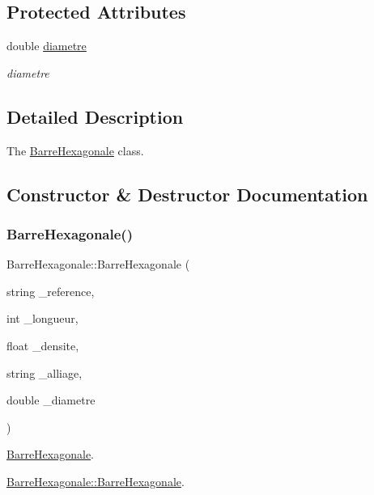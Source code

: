 \subsection*{Protected Attributes}
\begin{DoxyCompactItemize}
\item 
double \hyperlink{class_barre_hexagonale_acd0c0f0b698b467a732e44b28c5c17d1}{diametre}
\begin{DoxyCompactList}\small\item\em diametre \end{DoxyCompactList}\end{DoxyCompactItemize}


\subsection{Detailed Description}
The \hyperlink{class_barre_hexagonale}{Barre\+Hexagonale} class. 

\subsection{Constructor \& Destructor Documentation}
\mbox{\label{class_barre_hexagonale_a2d9337f0f27d17941747999db696f024}} 
\subsubsection{\texorpdfstring{Barre\+Hexagonale()}{BarreHexagonale()}}
{\footnotesize\ttfamily Barre\+Hexagonale\+::\+Barre\+Hexagonale (\begin{DoxyParamCaption}\item[{string}]{\+\_\+reference,  }\item[{int}]{\+\_\+longueur,  }\item[{float}]{\+\_\+densite,  }\item[{string}]{\+\_\+alliage,  }\item[{double}]{\+\_\+diametre }\end{DoxyParamCaption})}



\hyperlink{class_barre_hexagonale}{Barre\+Hexagonale}. 

\hyperlink{class_barre_hexagonale_a2d9337f0f27d17941747999db696f024}{Barre\+Hexagonale\+::\+Barre\+Hexagonale}.


